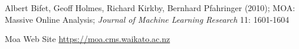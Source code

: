 % 

\begin{thebibliography}{99}


	\emph{} Albert Bifet, Geoff Holmes, Richard Kirkby, Bernhard Pfahringer (2010); MOA: Massive Online Analysis; \textit{Journal of Machine Learning Research} 11: 1601-1604 

	\emph{} Moa Web Site \url{https://moa.cms.waikato.ac.nz}

\end{thebibliography}
